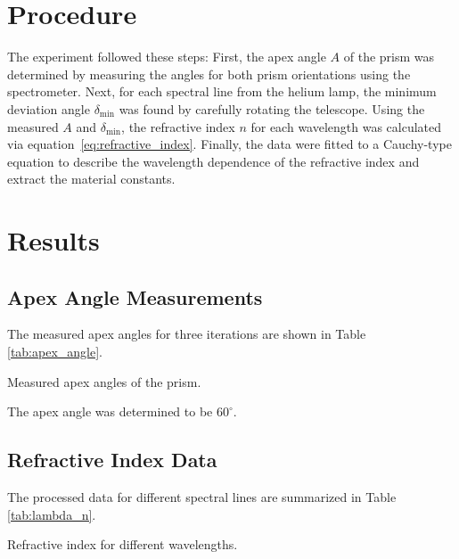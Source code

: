 \documentclass[journal]{IEEEtran}
\begin{document}
\section*{Procedure}
The experiment followed these steps: First, the apex angle \( A \) of the prism was determined by measuring the angles for both prism orientations using the spectrometer. Next, for each spectral line from the helium lamp, the minimum deviation angle \( \delta_{\min} \) was found by carefully rotating the telescope. Using the measured \( A \) and \( \delta_{\min} \), the refractive index \( n \) for each wavelength was calculated via equation~\ref{eq:refractive_index}. Finally, the data were fitted to a Cauchy-type equation to describe the wavelength dependence of the refractive index and extract the material constants.

\section{Results}
\subsection{Apex Angle Measurements}
The measured apex angles for three iterations are shown in Table \ref{tab:apex_angle}.

\begin{table}[H]
    \centering
    \caption{Measured apex angles of the prism.}
    \label{tab:apex_angle}
\end{table}

The apex angle was determined to be $60^\circ$.

\subsection{Refractive Index Data}
The processed data for different spectral lines are summarized in Table \ref{tab:lambda_n}.

\begin{table}[H]
    \centering
    \caption{Refractive index for different wavelengths.}
    \label{tab:lambda_n}
\end{table}
\end{document}
